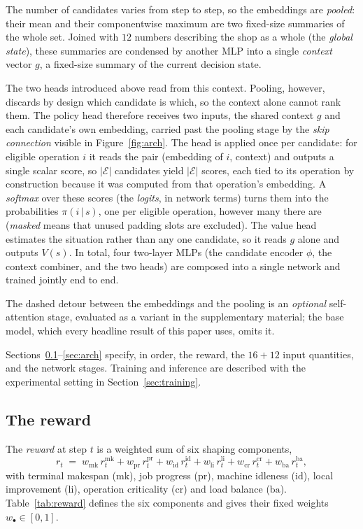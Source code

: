 \documentclass[preprint,authoryear,12pt]{elsarticle}
\theoremstyle{definition}
\theoremstyle{remark}
\begin{document}
The number of candidates varies from step to step, so the embeddings
are \emph{pooled}: their mean and their componentwise maximum are two
fixed-size summaries of the whole set. Joined with $12$ numbers
describing the shop as a whole
(the \emph{global state}), these summaries are condensed by another
MLP into a single \emph{context} vector $g$, a fixed-size summary of
the current decision state.

The two heads introduced above read from this context. Pooling,
however, discards by design which candidate is which, so the context
alone cannot rank them. The policy head therefore
receives two inputs, the shared context $g$ and each candidate's own
embedding, carried past the pooling stage by the \emph{skip
connection} visible in Figure~\ref{fig:arch}. The head is applied
once per candidate: for eligible operation $i$ it reads the pair
(embedding of $i$, context) and outputs a single scalar score, so
$|\mathcal{E}|$ candidates yield $|\mathcal{E}|$ scores, each tied to
its operation by construction because it was computed from that
operation's embedding. A \emph{softmax} over these scores (the
\emph{logits}, in network terms) turns them into the probabilities
$\pi(i\,|\,s)$, one per eligible operation, however many there are
(\emph{masked} means that unused padding slots are excluded). The
value head estimates the situation rather than any one candidate, so
it reads $g$ alone and outputs $V(s)$. In total, four two-layer
MLPs (the candidate encoder $\phi$, the context combiner, and the
two heads) are composed into a single network and trained jointly end to
end.

The dashed detour between the embeddings and the pooling is an
\emph{optional} self-attention stage, evaluated as a variant in the
supplementary material; the base model, which every headline
result of this paper uses, omits it.

Sections~\ref{sec:mdp}--\ref{sec:arch} specify, in order, the
reward, the $16{+}12$ input quantities, and the network stages.
Training and
inference are described with the experimental setting in
Section~\ref{sec:training}.

\subsection{The reward}
\label{sec:mdp}

The \emph{reward} at step $t$ is a weighted sum of six shaping
components,
\begin{equation}
\label{eq:reward}
r_t \;=\; w_{\mathrm{mk}}\,r^{\mathrm{mk}}_t
      + w_{\mathrm{pr}}\,r^{\mathrm{pr}}_t
      + w_{\mathrm{id}}\,r^{\mathrm{id}}_t
      + w_{\mathrm{li}}\,r^{\mathrm{li}}_t
      + w_{\mathrm{cr}}\,r^{\mathrm{cr}}_t
      + w_{\mathrm{ba}}\,r^{\mathrm{ba}}_t,
\end{equation}
with terminal makespan ($\mathrm{mk}$), job progress ($\mathrm{pr}$),
machine idleness ($\mathrm{id}$), local improvement ($\mathrm{li}$),
operation criticality ($\mathrm{cr}$) and load balance
($\mathrm{ba}$). Table~\ref{tab:reward} defines the six components
and gives their fixed weights $w_{\bullet}\in[0,1]$.
\end{document}

